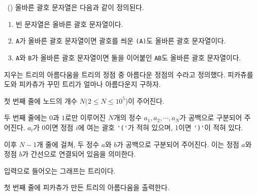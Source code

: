 \begin{problem}{\kcpcprobpretty\ (\kcpcprobprettyshort)}
    올바른 괄호 문자열은 다음과 같이 정의된다.
    \begin{enumerate}
        \item 빈 문자열은 올바른 괄호 문자열이다.
        \item \verb|A|가 올바른 괄호 문자열이면 괄호를 씌운 \verb|(A)|도 올바른 괄호 문자열이다.
        \item \verb|A|와 \verb|B|가 올바른 괄호 문자열이면 둘을 이어붙인 \verb|AB|도 올바른 괄호 문자열이다.
    \end{enumerate}
    
    지우는 트리의 아름다움을 트리의 정점 중 아름다운 정점의 수라고 정의했다. 피카츄를 도와 피카츄가 꾸민 트리가 얼마나 아름다운지 구하자.
    
    \InputFile
    첫 번째 줄에 노드의 개수 $N(2 \leq N \leq 10^5$)이 주어진다.
    
    두 번째 줄에는 $0$과 $1$로만 이루어진 $N$개의 정수 $a_1, a_2, \cdots, a_N$가 공백으로 구분되어 주어진다. $a_i$가 0이면 정점 $i$에 여는 괄호 \verb|'('|가 적혀 있으며, 1이면 \verb|')'|이 적혀 있다.
    
    이후 $N-1$개 줄에 걸쳐, 두 정수 $a$와 $b$가 공백으로 구분되어 주어진다. 이는 정점 $a$와 정점 $b$가 간선으로 연결되어 있음을 의미한다.
    
    입력으로 들어오는 그래프는 트리이다.
    
    \OutputFile
    첫 번째 줄에 피카츄가 만든 트리의 아름다움을 출력한다.
    
    \Examples
    \begin{example}
    \end{example}
    

\end{problem}
